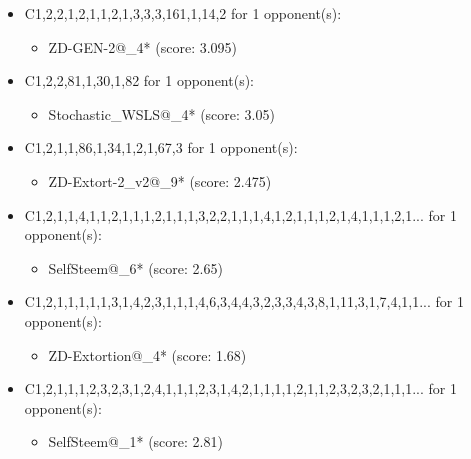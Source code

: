 \begin{appendices}
\begin{itemize}
    \item C1,2,2,1,2,1,1,2,1,3,3,3,161,1,14,2 for 1 opponent(s):
    \begin{multicols}{3}
         \begin{itemize}
            \item ZD-GEN-2@\_4* (score: 3.095)
        \end{itemize}
     \end{multicols}
     
    \item C1,2,2,81,1,30,1,82 for 1 opponent(s):
    \begin{multicols}{3}
         \begin{itemize}
            \item Stochastic\_WSLS@\_4* (score: 3.05)
        \end{itemize}
     \end{multicols}
     
    \item C1,2,1,1,86,1,34,1,2,1,67,3 for 1 opponent(s):
    \begin{multicols}{3}
         \begin{itemize}
            \item ZD-Extort-2\_v2@\_9* (score: 2.475)
        \end{itemize}
     \end{multicols}
     
    \item C1,2,1,1,4,1,1,2,1,1,1,2,1,1,1,3,2,2,1,1,1,4,1,2,1,1,1,2,1,4,1,1,1,2,1... for 1 opponent(s):
    \begin{multicols}{3}
         \begin{itemize}
            \item SelfSteem@\_6* (score: 2.65)
        \end{itemize}
     \end{multicols}
     
    \item C1,2,1,1,1,1,1,3,1,4,2,3,1,1,1,4,6,3,4,4,3,2,3,3,4,3,8,1,11,3,1,7,4,1,1... for 1 opponent(s):
    \begin{multicols}{3}
         \begin{itemize}
            \item ZD-Extortion@\_4* (score: 1.68)
        \end{itemize}
     \end{multicols}
     
    \item C1,2,1,1,1,2,3,2,3,1,2,4,1,1,1,2,3,1,4,2,1,1,1,1,2,1,1,2,3,2,3,2,1,1,1... for 1 opponent(s):
    \begin{multicols}{3}
         \begin{itemize}
            \item SelfSteem@\_1* (score: 2.81)
        \end{itemize}
     \end{multicols}
     

\end{itemize}
\end{appendices}
